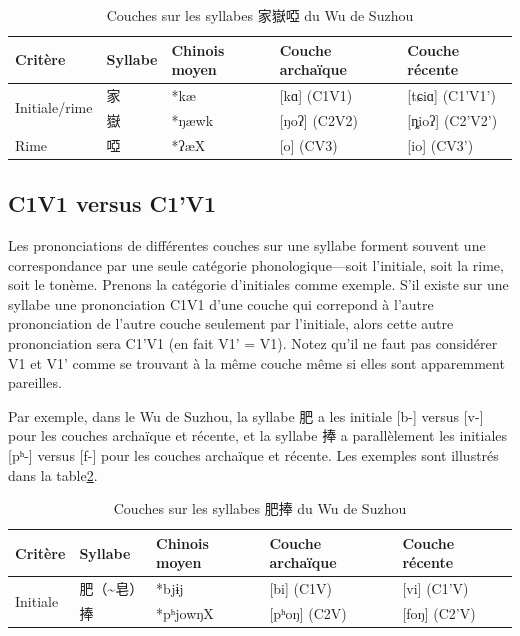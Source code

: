 \documentclass{scrbook}
\newcounter{c}[subsubsection]
\newcommand{\bolang}{\textasciitilde}
\newcommand{\difwenbai}{couches archaïque et récente\xspace}
\newcommand{\illustre}{Les exemples sont illustrés dans la table\xspace}
\begin{document}
\begin{sloppypar}

\begin{table}[htbp]
  \centering
    \begin{tabular}{lllll}
    \toprule
    Critère & Syllabe & Chinois moyen  & Couche archaïque & Couche récente \\
    \midrule
    \multirow{2}[2]{*}{Initiale/rime} & 家     & *kæ   & [kɑ] (C1V1) & [tɕiɑ] (C1'V1') \\
          & 嶽     & *ŋæwk & [ŋoʔ] (C2V2) & [ȵioʔ] (C2'V2') \\
    \midrule
    Rime  & 啞     & *ʔæX  & [o] (CV3) & [io] (CV3') \\
    \bottomrule
    \end{tabular}%
  \caption{Couches sur les syllabes 家嶽啞 du Wu de Suzhou}
  \label{tab:exemple_coherence1_suzhou}%
\end{table}%

\subsection{C1V1 versus C1'V1}\label{coherence2}
Les prononciations de différentes couches sur une syllabe forment souvent une correspondance par une seule catégorie phonologique---soit l'initiale, soit la rime, soit le tonème. Prenons la catégorie d'initiales comme exemple. S'il existe sur une syllabe une prononciation C1V1 d'une couche qui correpond à l'autre prononciation de l'autre couche seulement par l'initiale, alors cette autre prononciation sera C1'V1 (en fait V1' = V1). Notez qu'il ne faut pas considérer V1 et V1' comme se trouvant à la même couche même si elles sont apparemment pareilles.

Par exemple, dans le Wu de Suzhou, la syllabe 肥 a les initiale [b-] versus [v-] pour les \difwenbai, et la syllabe 捧 a parallèlement les initiales [pʰ-] versus [f-] pour les \difwenbai. \illustre \ref{tab:exemple_coherence2_suzhou}.

\begin{table}[htbp]
  \centering
    \begin{tabular}{lllll}
    \toprule
    Critère & Syllabe & Chinois moyen  & Couche archaïque & Couche récente \\
    \midrule
    \multirow{2}[2]{*}{Initiale} & 肥（\bolang 皂） & *bjɨj & [bi] (C1V) & [vi] (C1'V) \\
          & 捧     & *pʰjowŋX & [pʰoŋ] (C2V) & [foŋ] (C2'V) \\
    \bottomrule
    \end{tabular}%
  \caption{Couches sur les syllabes 肥捧 du Wu de Suzhou}
  \label{tab:exemple_coherence2_suzhou}%
\end{table}%


\end{sloppypar}
\end{document}
